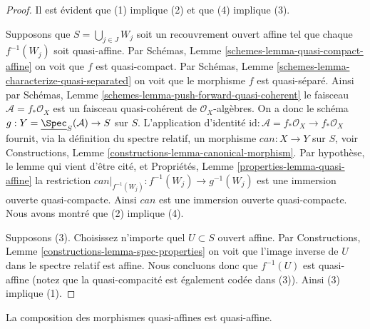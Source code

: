 \begin{proof}
Il est évident que (1) implique (2) et que (4) implique (3).

\medskip\noindent
Supposons que $S = \bigcup_{j \in J} W_j$ soit un recouvrement ouvert
affine tel que chaque $f^{-1}(W_j)$
soit quasi-affine. Par Schémas, Lemme \ref{schemes-lemma-quasi-compact-affine}
on voit que $f$
est quasi-compact. Par Schémas, Lemme \ref{schemes-lemma-characterize-quasi-separated}
on voit que le morphisme $f$ est
quasi-séparé. Ainsi par Schémas, Lemme \ref{schemes-lemma-push-forward-quasi-coherent}
le faisceau $\mathcal{A} = f_*\mathcal{O}_X$ est un faisceau quasi-cohérent
de $\mathcal{O}_X$-algèbres. On a donc le schéma
$g : Y = \underline{\Spec}_S(\mathcal{A}) \to S$ sur $S$. L'application
d'identité
$\text{id} : \mathcal{A} = f_*\mathcal{O}_X \to f_*\mathcal{O}_X$ fournit, via la définition du spectre relatif,
un morphisme $can : X \to Y$ sur $S$,
voir Constructions, Lemme
\ref{constructions-lemma-canonical-morphism}. Par hypothèse, le lemme qui vient d'être
cité, et Propriétés, Lemme
\ref{properties-lemma-quasi-affine} la restriction $can|_{f^{-1}(W_j)} : f^{-1}(W_j) \to g^{-1}(W_j)$ est
une immersion ouverte quasi-compacte. Ainsi $can$
est une immersion ouverte quasi-compacte. Nous
avons montré que (2) implique (4).

\medskip\noindent
Supposons (3). Choisissez n’importe quel $U \subset S$
ouvert affine. Par Constructions, Lemme \ref{constructions-lemma-spec-properties} on voit que l'image
inverse de $U$ dans le spectre relatif est affine.
Nous concluons donc que $f^{-1}(U)$ est quasi-affine (notez
que la quasi-compacité est également codée dans (3)). Ainsi
(3) implique (1).
\end{proof}

\begin{lemma}
\label{lemma-composition-quasi-affine}
La composition des morphismes quasi-affines est quasi-affine.
\end{lemma}


